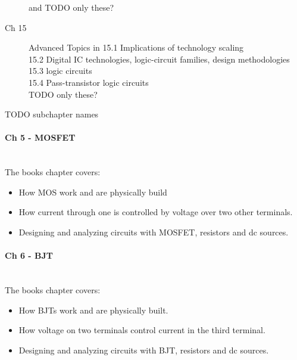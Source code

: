 \begin{description}
               and 
               TODO only these?
  \item [Ch 15] Advanced Topics in 
               15.1 Implications of technology scaling \\
               15.2 Digital IC technologies, logic-circuit families,
                    design methodologies \\
               15.3  logic circuits \\
               15.4 Pass-transistor logic circuits \\
               TODO only these?
\end{description}

TODO subchapter names

\paragraph{Ch 5 - MOSFET} \hfill \\
The books chapter covers:
\begin{itemize}
  \item How MOS  work and are physically build
  \item How current through one  is controlled by voltage
        over two other terminals.
  \item Designing and analyzing circuits with MOSFET, resistors and dc sources.
\end{itemize}

\paragraph{Ch 6 - BJT} \hfill \\
The books chapter covers:
\begin{itemize}
  \item How BJTs work and are physically built.
  \item How voltage on two terminals control current in the third terminal.
  \item Designing and analyzing circuits with BJT, resistors and dc sources.
\end{itemize}

